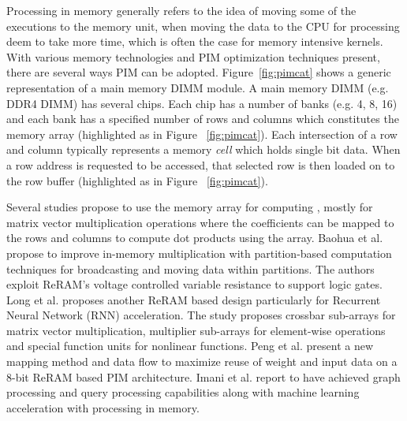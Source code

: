




Processing in memory generally refers to the idea of moving some of the executions to the memory unit, when moving the data to the CPU for processing deem to take more time, which is often the case for memory intensive kernels. With various memory technologies and PIM optimization techniques present, there are several ways PIM can be adopted. Figure~\ref{fig:pimcat} shows a generic representation of a main memory DIMM module. A main memory DIMM (e.g. DDR4 DIMM) has several chips. Each chip has a number of banks (e.g. 4, 8, 16) and each bank has a specified number of rows and columns which constitutes the memory array (highlighted as  in Figure ~\ref{fig:pimcat}). Each intersection of a row and column typically represents a memory \textit{cell} which holds single bit data. When a row address is requested to be accessed, that selected row is then loaded on to the row buffer (highlighted as  in Figure ~\ref{fig:pimcat}). 



Several studies propose to use the memory array  for computing \cite{03,06,13,15,20,29}, mostly for matrix vector multiplication operations where the coefficients can be mapped to the rows and columns to compute dot products using the array. Baohua et al. \cite{13} propose to improve in-memory multiplication with partition-based computation techniques for broadcasting and moving data within partitions. The authors exploit ReRAM's voltage controlled variable resistance to support logic gates. Long et al. \cite{20} proposes another ReRAM based design particularly for Recurrent Neural Network (RNN) acceleration. The study proposes crossbar sub-arrays for matrix vector multiplication, multiplier sub-arrays for element-wise operations and special function units for nonlinear functions. Peng et al. \cite{15} present a new mapping method and data flow to maximize reuse of weight and input data on a 8-bit ReRAM based PIM architecture. Imani et al. \cite{6} report to have achieved graph processing and query processing capabilities along with machine learning acceleration with processing in memory.  



